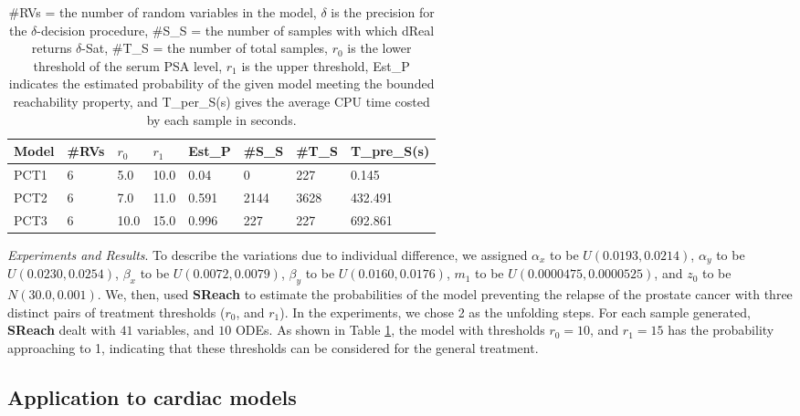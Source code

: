 \begin{table}[h]
\centering
    \begin{tabular}{|l|l|l|l|l|l|l|l|}
    \hline
    Model & \#RVs & $r_0$ & $r_1$ & Est\_P & \#S\_S & \#T\_S & T\_pre\_S(s) \\ \hline
    PCT1  & 6     & 5.0  & 10.0 & 0.04   & 0      & 227    & 0.145        \\ \hline
    PCT2  & 6     & 7.0  & 11.0 & 0.591  & 2144   & 3628   & 432.491      \\ \hline
    PCT3  & 6     & 10.0 & 15.0 & 0.996  & 227    & 227    & 692.861      \\ \hline
    \end{tabular}
    \caption {\#RVs = the number of random variables in the model, $\delta$ is the precision for the $\delta$-decision procedure, \#S\_S = the number of samples with which dReal returns $\delta$-Sat, \#T\_S = the number of total samples, $r_0$ is the lower threshold of the serum PSA level, $r_1$ is the upper threshold, Est\_P indicates the estimated probability of the given model meeting the bounded reachability property, and T\_per\_S(s) gives the average CPU time costed by each sample in seconds.}
    \label{table:prostate}
\end{table}

\textit{Experiments and Results}. To describe the variations due to individual difference, we assigned $\alpha_x$ to be $U(0.0193, 0.0214)$, $\alpha_y$ to be $U(0.0230, 0.0254)$, $\beta_x$ to be $U(0.0072, 0.0079)$, $\beta_y$ to be $U(0.0160, 0.0176)$, $m_1$ to be $U(0.0000475, 0.0000525) $, and $z_0$ to be $N(30.0, 0.001)$. We, then, used {\bf SReach} to estimate the probabilities of the model preventing the relapse of the prostate cancer with three distinct pairs of treatment thresholds ($r_0$, and $r_1$).  In the experiments, we chose 2 as the unfolding steps. For each sample generated, {\bf SReach} dealt with $41$ variables, and $10$ ODEs. As shown in Table \ref{table:prostate}, the model with thresholds $r_0 = 10$, and $r_1 = 15$ has the probability approaching to 1, indicating that these thresholds can be considered for the general treatment. 

\subsection{Application to cardiac models}

